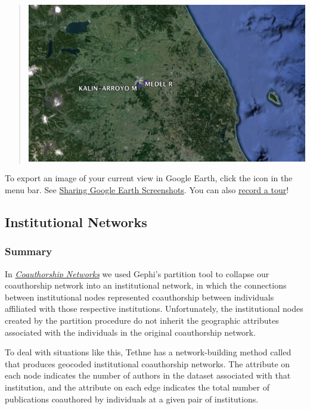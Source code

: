 \documentclass[letterpaper,10pt,english]{sphinxmanual}
\begin{document}
\begin{quote}
\begin{itemize}
\end{itemize}

{\hfill\includegraphics{geo16.png}\hfill}
\end{quote}

To export an image of your current view in Google Earth, click the  icon
in the menu bar. See \href{http://www.google.com/earth/learn/beginner.html\#tab=sharing-google-earth-screenshots}{Sharing Google Earth Screenshots}.
You can also \href{http://www.google.com/earth/learn/advanced.html\#tab=recording-a-tour}{record a tour}!


\subsection{Institutional Networks}
\label{tutorial.geonetworks:institutional-networks}

\subsubsection{Summary}
\label{tutorial.geonetworks:summary}
In {\hyperref[tutorial.coauthors:coauthorship]{\emph{Coauthorship Networks}}} we used Gephi's partition tool to collapse our coauthorship network
into an institutional network, in which the connections between institutional nodes
represented coauthorship between individuals affiliated with those respective
institutions. Unfortunately, the institutional nodes created by the partition procedure
do not inherit the geographic attributes associated with the individuals in the original
coauthorship network.

To deal with situations like this, Tethne has a network-building
method called {\hyperref[tethne.networks.authors:tethne.networks.authors.institutions]{}} that produces geocoded institutional
coauthorship networks. The  attribute on each node indicates the number of authors
in the dataset associated with that institution, and the  attribute on each
edge indicates the total number of publications coauthored by individuals at a given pair
of institutions.
\end{document}
